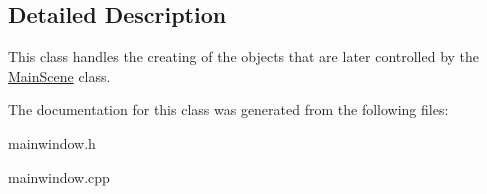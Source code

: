\subsection{Detailed Description}
This class handles the creating of the objects that are later controlled by the \hyperlink{class_main_scene}{Main\+Scene} class. 

The documentation for this class was generated from the following files\+:\begin{DoxyCompactItemize}
\item 
mainwindow.\+h\item 
mainwindow.\+cpp\end{DoxyCompactItemize}
